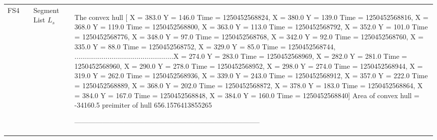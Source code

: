 \begin{landscape}
\begin{scriptsize}
\begin{longtable}{|p{2cm}|p{2cm}|p{2cm}|p{2cm}|p{13cm}|}
  \\ \hline
FS4   &  &Segment List $L_s$   &  &  \begin{scriptsize} 
 The convex hull    [ X = 383.0   Y = 146.0  Time = 1250452568824,  X = 380.0   Y = 139.0  Time = 1250452568816,  X = 368.0   Y = 119.0  Time = 1250452568800,  X = 363.0   Y = 113.0  Time = 1250452568792,  X = 352.0   Y = 101.0  Time = 1250452568776,  X = 348.0   Y = 97.0  Time = 1250452568768,  X = 342.0   Y = 92.0  Time = 1250452568760,  X = 335.0   Y = 88.0  Time = 1250452568752,  X = 329.0   Y = 85.0  Time = 1250452568744, %
 ...................................................X = 274.0   Y = 283.0  Time = 1250452568969,  X = 282.0   Y = 281.0  Time = 1250452568960,  X = 290.0   Y = 278.0  Time = 1250452568952,  X = 298.0   Y = 274.0  Time = 1250452568944,  X = 319.0   Y = 262.0  Time = 1250452568936,  X = 339.0   Y = 243.0  Time = 1250452568912,  X = 357.0   Y = 222.0  Time = 1250452568889,  X = 368.0   Y = 202.0  Time = 1250452568872,  X = 378.0   Y = 183.0  Time = 1250452568864,  X = 384.0   Y = 167.0  Time = 1250452568848,  X = 384.0   Y = 160.0  Time = 1250452568840]
 Area of convex hull =  -34160.5   preimiter of hull 656.1576413855265
 
 --------------------------------------------------------------------------------
 

\end{scriptsize}
\end{longtable}
\end{scriptsize}
\end{landscape}

